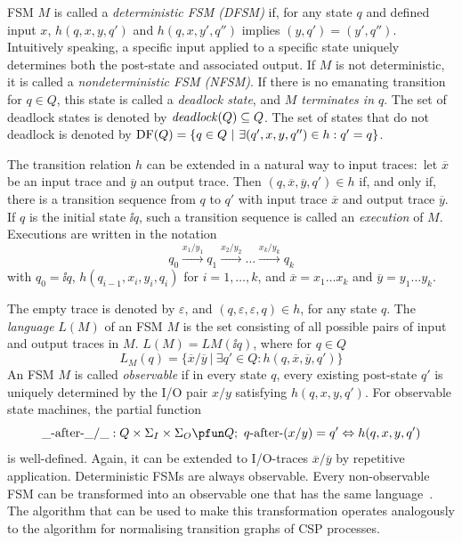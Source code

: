 FSM $M$ is called a \emph{deterministic FSM (DFSM)} if, for any state $q$ and
defined input $x$, $h(q,x,y,q')$ and $h(q,x,y',q'')$ implies $(y,q') =
(y',q'')$. Intuitively speaking, a specific input applied to a specific state
uniquely determines both the post-state and associated output. If $M$ is not
deterministic, it is called a \emph{nondeterministic FSM (NFSM)}. If there is
no emanating transition for $q\in Q$, this state is called a \emph{deadlock
state}, and \emph{$M$ terminates in $q$}. The set of deadlock states is
denoted by ${\it deadlock}(Q)\subseteq Q$. The set of states that do not deadlock
is denoted by $\text{DF}(Q) = \{ q\in Q~|~\exists (q',x,y,q'')\in h: q' = q \}$.

The transition relation $h$ can be extended in a natural way to input
traces:~let $\overline{x}$ be an input trace and $\overline{y}$ an output
trace. Then $(q,\overline{x},\overline{y},q')\in h$ if, and only if, there is
a transition sequence from $q$ to $q'$ with input trace $\overline{x}$ and
output trace $\overline{y}$. If $q$ is the initial state $\ii{q}$, such a
transition sequence is called an \emph{execution} of $M$. Executions are
written in the notation
$$
q_0 \xrightarrow{x_1/y_1} q_1 \xrightarrow{x_2/y_2} \dots \xrightarrow{x_{k}/y_{k}} q_{k}
$$
with $q_0 = \ii{q}$, $h(q_{i-1},x_i,y_i,q_{i})$ for $i = 1,\dots,k$, and
$\overline{x} = x_1\dots x_k$ and $\overline{y} = y_1\dots y_k$.

The empty trace is denoted by $\varepsilon$, and
$(q,\varepsilon,\varepsilon,q)\in h$, for any state $q$. The \emph{language}
$L(M)$ of an FSM $M$ is the set consisting of all possible pairs of input and
output traces in $M$. $L(M)= LM(\ii{q})$, where for $q\in Q$
$$
  L_M(q)=\{\overline{x}/\overline{y}~|~\exists q'\in Q: h(q,\overline{x},\overline{y},q')\}
$$
An FSM $M$ is called \emph{observable} if in every state $q$, every existing
post-state $q'$ is uniquely determined by the I/O pair $x/y$ satisfying
$h(q,x,y,q')$. For observable state machines, the partial function
$$
\_ \after\_ /\_ : Q\times\Sigma_I\times \Sigma_O \pfun Q;\
q\after(x/y) = q' \Leftrightarrow h(q,x,y,q')
$$
is well-defined. Again, it can be extended to I/O-traces $\overline
x/\overline y$ by repetitive application. Deterministic FSMs are always
observable. Every non-observable FSM can be transformed into an observable
one that has the same language~\cite{PeleskaHuangLectureNotesMBT}. The
algorithm that can be used to make this transformation operates analogously
to the algorithm for normalising transition graphs of CSP processes.

